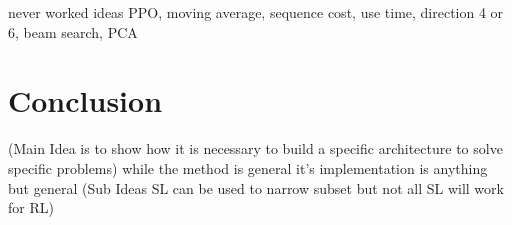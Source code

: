 \documentclass[12pt]{article}
\begin{document}





never worked ideas PPO, moving average, sequence cost, use time, direction 4 or 6, beam search, PCA

\section{Conclusion}
(Main Idea is to show how it is necessary to build a specific architecture to solve specific problems)
    while the method is general it's implementation is anything but general
(Sub Ideas SL can be used to narrow subset but not all SL will work for RL)


\citet{2016_Mnih}



\end{document}
